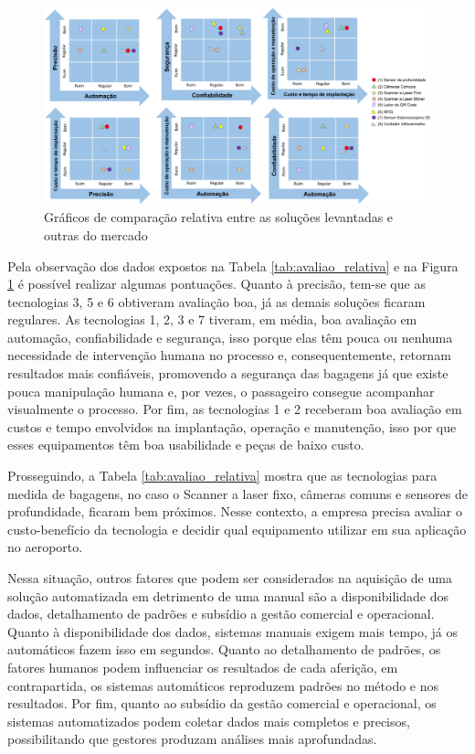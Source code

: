         \begin{figure}[h]
           \centering
           \includegraphics[width=1\textwidth]{imagens/graficos_comparacao_entre_tecnologias.png}
           \caption{Gráficos de comparação relativa entre as soluções levantadas e outras do mercado}
          \label{fig:graficos_comparacao_entre_tecnologias}
        \end{figure}


Pela observação dos dados expostos na Tabela \ref{tab:avaliao_relativa} e na Figura \ref{fig:graficos_comparacao_entre_tecnologias} é possível realizar algumas pontuações. Quanto à precisão, tem-se que as tecnologias 3, 5 e 6 obtiveram avaliação boa, já as demais soluções ficaram regulares. As tecnologias 1, 2, 3 e 7 tiveram, em média, boa avaliação em automação, confiabilidade e segurança, isso porque elas têm pouca ou nenhuma necessidade de intervenção humana no processo e, consequentemente, retornam resultados mais confiáveis, promovendo a segurança das bagagens já que existe pouca manipulação humana e, por vezes, o passageiro consegue acompanhar visualmente o processo. Por fim, as tecnologias 1 e 2 receberam boa avaliação em custos e tempo envolvidos na implantação, operação e manutenção, isso por que esses equipamentos têm boa usabilidade e peças de baixo custo. 

Prosseguindo, a Tabela \ref{tab:avaliao_relativa} mostra que as tecnologias para medida de bagagens, no caso o  Scanner a laser fixo, câmeras comuns e sensores de profundidade, ficaram bem próximos. Nesse contexto, a empresa precisa avaliar o custo-benefício da tecnologia e decidir qual equipamento utilizar em sua aplicação no aeroporto.

Nessa situação, outros fatores que podem ser considerados na aquisição de uma solução automatizada em detrimento de uma manual são a disponibilidade dos dados, detalhamento de padrões e subsídio a gestão comercial e operacional. Quanto à disponibilidade dos dados, sistemas manuais exigem mais tempo, já os automáticos fazem isso em segundos. Quanto ao detalhamento de padrões, os fatores humanos podem influenciar os resultados de cada aferição, em contrapartida, os sistemas automáticos reproduzem padrões no método e nos resultados. Por fim, quanto ao subsídio da gestão comercial e operacional, os sistemas automatizados podem coletar dados mais completos e precisos, possibilitando que gestores produzam análises mais aprofundadas.




